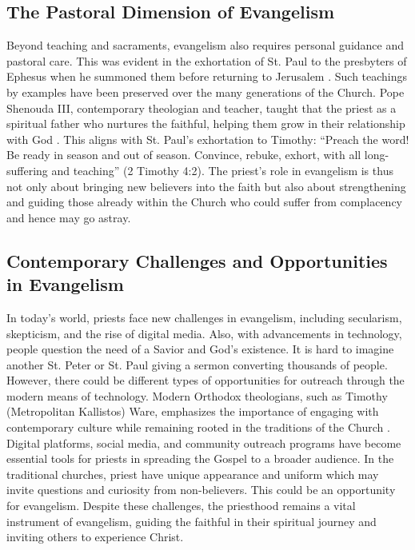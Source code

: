 \documentclass[12pt,doc]{apa7}   	%
\begin{document}
\subsection{The Pastoral Dimension of Evangelism}

Beyond teaching and sacraments, evangelism also requires personal guidance and pastoral care.  This was evident in the exhortation of St. Paul to the presbyters of Ephesus when he summoned them before returning to Jerusalem \citep{paul_wright}.  Such teachings by examples have been preserved over the many generations of the Church. Pope Shenouda III, contemporary theologian and teacher, taught that the priest as a spiritual father who nurtures the faithful, helping them grow in their relationship with God \citep{priesthood_shenouda}. This aligns with St. Paul’s exhortation to Timothy: “Preach the word! Be ready in season and out of season. Convince, rebuke, exhort, with all long-suffering and teaching” (2 Timothy 4:2). The priest’s role in evangelism is thus not only about bringing new believers into the faith but also about strengthening and guiding those already within the Church who could suffer from complacency and hence may go astray.

\subsection{Contemporary Challenges and Opportunities in Evangelism}

In today’s world, priests face new challenges in evangelism, including secularism, skepticism, and the rise of digital media.  Also, with advancements in technology, people question the need of a Savior and God's existence.  It is hard to imagine another St. Peter or St. Paul giving a sermon converting thousands of people. However, there could be different types of opportunities for outreach through the modern means of technology. Modern Orthodox theologians, such as Timothy (Metropolitan Kallistos) Ware, emphasizes the importance of engaging with contemporary culture while remaining rooted in the traditions of the Church \citep{orthodox_church_ware}. Digital platforms, social media, and community outreach programs have become essential tools for priests in spreading the Gospel to a broader audience.  In the traditional churches, priest have unique appearance and uniform which may invite questions and curiosity from non-believers.  This could be an opportunity for evangelism.  Despite these challenges, the priesthood remains a vital instrument of evangelism, guiding the faithful in their spiritual journey and inviting others to experience Christ.
\end{document}
